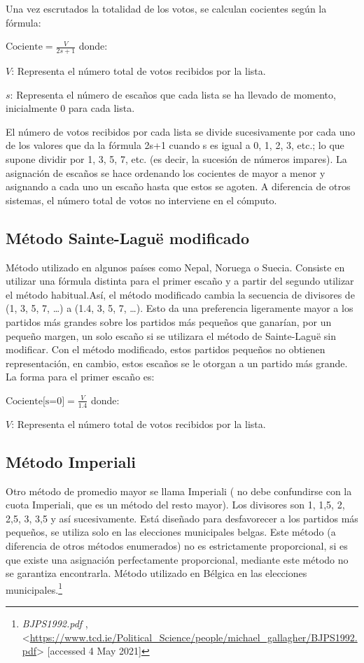 \documentclass[12pt,a4paper,]{book}
\let\rmarkdownfootnote\footnote%
\def\footnote{\protect\rmarkdownfootnote}
\numberwithin{dummy}{section}
\theoremstyle{ocrenumbox}
\theoremstyle{blacknumex}
\theoremstyle{blacknumbox}
\theoremstyle{ocrenum}
\theoremstyle{ocrenum}
\begin{document}
Una vez escrutados la totalidad de los votos, se calculan cocientes
según la fórmula:

\(\textrm{Cociente} = \frac{V}{2s+1}\) donde:

\(V\): Representa el número total de votos recibidos por la lista.

\(s\): Representa el número de escaños que cada lista se ha llevado de
momento, inicialmente 0 para cada lista.

El número de votos recibidos por cada lista se divide sucesivamente por
cada uno de los valores que da la fórmula 2s+1 cuando s es igual a 0, 1,
2, 3, etc.; lo que supone dividir por 1, 3, 5, 7, etc. (es decir, la
sucesión de números impares). La asignación de escaños se hace ordenando
los cocientes de mayor a menor y asignando a cada uno un escaño hasta
que estos se agoten. A diferencia de otros sistemas, el número total de
votos no interviene en el cómputo.

\hypertarget{muxe9todo-sainte-laguuxeb-modificado}{%
\subsection{Método Sainte-Laguë
modificado}\label{muxe9todo-sainte-laguuxeb-modificado}}

Método utilizado en algunos países como Nepal, Noruega o Suecia.
Consiste en utilizar una fórmula distinta para el primer escaño y a
partir del segundo utilizar el método habitual.Así, el método modificado
cambia la secuencia de divisores de (1, 3, 5, 7, \ldots) a (1.4, 3, 5,
7, \ldots). Esto da una preferencia ligeramente mayor a los partidos más
grandes sobre los partidos más pequeños que ganarían, por un pequeño
margen, un solo escaño si se utilizara el método de Sainte-Laguë sin
modificar. Con el método modificado, estos partidos pequeños no obtienen
representación, en cambio, estos escaños se le otorgan a un partido más
grande. La forma para el primer escaño es:

\(\textrm{Cociente[s=0]} = \frac{V}{1.4}\) donde:

\(V\): Representa el número total de votos recibidos por la lista.

\hypertarget{muxe9todo-imperiali}{%
\subsection{Método Imperiali}\label{muxe9todo-imperiali}}

Otro método de promedio mayor se llama Imperiali ( no debe confundirse
con la cuota Imperiali, que es un método del resto mayor). Los divisores
son 1, 1,5, 2, 2,5, 3, 3,5 y así sucesivamente. Está diseñado para
desfavorecer a los partidos más pequeños, se utiliza solo en las
elecciones municipales belgas. Este método (a diferencia de otros
métodos enumerados) no es estrictamente proporcional, si es que existe
una asignación perfectamente proporcional, mediante este método no se
garantiza encontrarla. Método utilizado en Bélgica en las elecciones
municipales.\footnote{\emph{BJPS1992.pdf} ,
  \textless{}\url{https://www.tcd.ie/Political_Science/people/michael_gallagher/BJPS1992.pdf}\textgreater{}
  {[}accessed 4 May 2021{]}}
\end{document}
